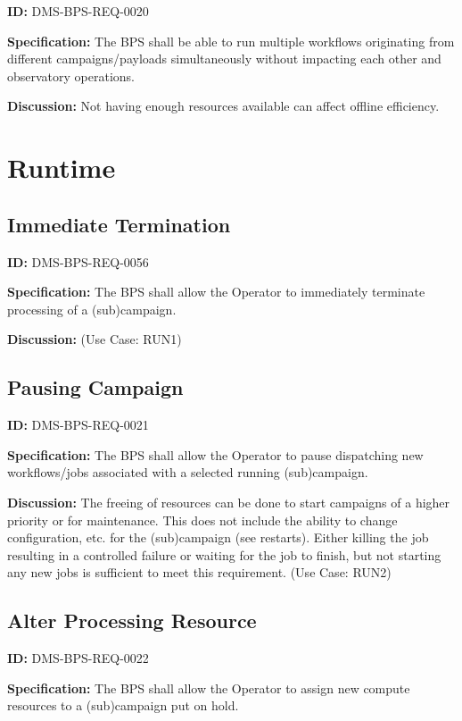 \documentclass[SE,toc]{lsstdoc}
\begin{document}
\label{DMS-BPS-REQ-0020}
\textbf{ID:} DMS-BPS-REQ-0020

\textbf{Specification:}
The BPS shall be able to run multiple workflows originating from different campaigns/payloads simultaneously without impacting each other and observatory operations.

\textbf{Discussion:}
Not having enough resources available can affect offline efficiency.

\section{Runtime}

\subsection{Immediate Termination}

\label{DMS-BPS-REQ-0056}
\textbf{ID:} DMS-BPS-REQ-0056

\textbf{Specification:}
The BPS shall allow the Operator to immediately terminate processing of a (sub)campaign.

\textbf{Discussion:}
(Use Case: RUN1)

\subsection{Pausing Campaign}

\label{DMS-BPS-REQ-0021}
\textbf{ID:} DMS-BPS-REQ-0021

\textbf{Specification:}
The BPS shall allow the Operator to pause dispatching new workflows/jobs associated with a selected running (sub)campaign.

\textbf{Discussion:}
The freeing of resources can be done to start campaigns of a higher priority or for maintenance. This does not include the ability to change configuration, etc. for the (sub)campaign (see restarts). Either killing the job resulting in a controlled failure or waiting for the job to finish, but not starting any new jobs is sufficient to meet this requirement.  (Use Case: RUN2)

\subsection{Alter Processing Resource}

\label{DMS-BPS-REQ-0022}
\textbf{ID:} DMS-BPS-REQ-0022

\textbf{Specification:}
The BPS shall allow the Operator to assign new compute resources to a (sub)campaign put on hold.
\end{document}
